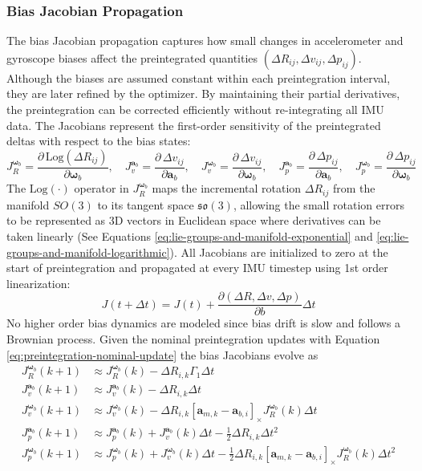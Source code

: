 \subsubsection{Bias Jacobian Propagation}
The bias Jacobian propagation captures how small changes in accelerometer and gyroscope biases affect the preintegrated quantities $(\Delta R_{ij}, \Delta v_{ij}, \Delta p_{ij})$. Although the biases are assumed constant within each preintegration interval, they are later refined by the optimizer. By maintaining their partial derivatives, the preintegration can be corrected efficiently without re-integrating all IMU data. The Jacobians represent the first-order sensitivity of the preintegrated deltas with respect to the bias states:
$$
    J_R^{\boldsymbol{\omega}_b} = \frac{\partial\,\text{Log}(\Delta R_{ij})}{\partial \boldsymbol{\omega}_b}, \quad
    J_v^{\mathbf{a}_b} = \frac{\partial\,\Delta v_{ij}}{\partial \mathbf{a}_b}, \quad
    J_v^{\boldsymbol{\omega}_b} = \frac{\partial\,\Delta v_{ij}}{\partial \boldsymbol{\omega}_b}, \quad
    J_p^{\mathbf{a}_b} = \frac{\partial\,\Delta p_{ij}}{\partial \mathbf{a}_b}, \quad
    J_p^{\boldsymbol{\omega}_b} = \frac{\partial\,\Delta p_{ij}}{\partial \boldsymbol{\omega}_b}
$$
The $\text{Log}(\cdot)$ operator in $J_R^{\boldsymbol{\omega}_b}$ maps the incremental rotation $\Delta R_{ij}$ from the manifold $SO(3)$ to its tangent space $\mathfrak{so}(3)$, allowing the small rotation errors to be represented as 3D vectors in Euclidean space where derivatives can be taken linearly (See Equations \ref{eq:lie-groups-and-manifold-exponential} and \ref{eq:lie-groups-and-manifold-logarithmic}). All Jacobians are initialized to zero at the start of preintegration and propagated at every IMU timestep using 1st order linearization:
$$
    J(t+\Delta t) = J(t) + \frac{\partial(\Delta R, \Delta v, \Delta p)}{\partial b}\Delta t
$$
No higher order bias dynamics are modeled since bias drift is slow and follows a Brownian process. Given the nominal preintegration updates with Equation \ref{eq:preintegration-nominal-update} the bias Jacobians evolve as
$$
    \begin{aligned}
    J_R^{\boldsymbol{\omega}_b}(k+1) &\approx J_R^{\boldsymbol{\omega}_b}(k) - \Delta R_{i,k}\Gamma_1\Delta t \\
    J_v^{\mathbf{a}_b}(k+1) &\approx J_v^{\mathbf{a}_b}(k) - \Delta R_{i,k}\Delta t \\
    J_v^{\boldsymbol{\omega}_b}(k+1) &\approx J_v^{\boldsymbol{\omega}_b}(k) - \Delta R_{i,k}[\mathbf{a}_{m,k} - \mathbf{a}_{b,i}]_\times J_R^{\boldsymbol{\omega}_b}(k)\Delta t \\
    J_p^{\mathbf{a}_b}(k+1) &\approx J_p^{\mathbf{a}_b}(k) + J_v^{\mathbf{a}_b}(k)\Delta t - \tfrac{1}{2}\Delta R_{i,k}\Delta t^2 \\
    J_p^{\boldsymbol{\omega}_b}(k+1) &\approx J_p^{\boldsymbol{\omega}_b}(k) + J_v^{\boldsymbol{\omega}_b}(k)\Delta t - \tfrac{1}{2}\Delta R_{i,k}[\mathbf{a}_{m,k} - \mathbf{a}_{b,i}]_\times J_R^{\boldsymbol{\omega}_b}(k)\Delta t^2
    \end{aligned}
$$
